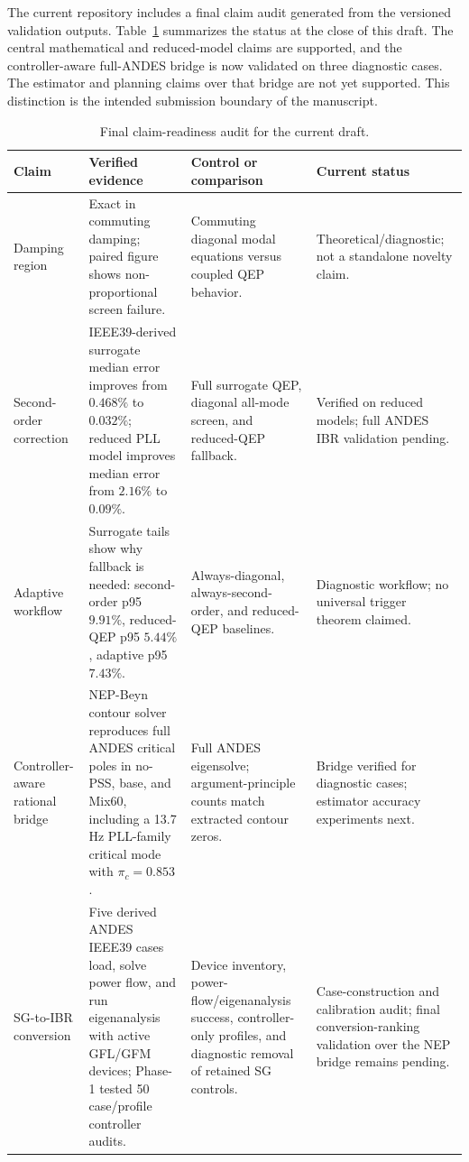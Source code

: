 \documentclass[journal]{IEEEtran}
\begin{document}
The current repository includes a final claim audit generated from the versioned validation outputs. Table~\ref{tab:finalaudit} summarizes the status at the close of this draft. The central mathematical and reduced-model claims are supported, and the controller-aware full-ANDES bridge is now validated on three diagnostic cases. The estimator and planning claims over that bridge are not yet supported. This distinction is the intended submission boundary of the manuscript.

\begin{table}[t]
\centering
\caption{Final claim-readiness audit for the current draft.}
\label{tab:finalaudit}
\scriptsize
\begin{tabular}{@{}p{}p{}p{}p{}@{}}
\toprule
Claim & Verified evidence & Control or comparison & Current status\\
\midrule
Damping region
& Exact in commuting damping; paired figure shows non-proportional screen failure.
& Commuting diagonal modal equations versus coupled QEP behavior.
& Theoretical/diagnostic; not a standalone novelty claim.\\
Second-order correction
& IEEE39-derived surrogate median error improves from $0.468\%$ to $0.032\%$; reduced PLL model improves median error from $2.16\%$ to $0.09\%$.
& Full surrogate QEP, diagonal all-mode screen, and reduced-QEP fallback.
& Verified on reduced models; full ANDES IBR validation pending.\\
Adaptive workflow
& Surrogate tails show why fallback is needed: second-order p95 $9.91\%$, reduced-QEP p95 $5.44\%$, adaptive p95 $7.43\%$.
& Always-diagonal, always-second-order, and reduced-QEP baselines.
& Diagnostic workflow; no universal trigger theorem claimed.\\
Controller-aware rational bridge
& NEP-Beyn contour solver reproduces full ANDES critical poles in no-PSS, base, and Mix60, including a 13.7 Hz PLL-family critical mode with $\pi_c=0.853$.
& Full ANDES eigensolve; argument-principle counts match extracted contour zeros.
& Bridge verified for diagnostic cases; estimator accuracy experiments next.\\
SG-to-IBR conversion
& Five derived ANDES IEEE39 cases load, solve power flow, and run eigenanalysis with active GFL/GFM devices; Phase-1 tested 50 case/profile controller audits.
& Device inventory, power-flow/eigenanalysis success, controller-only profiles, and diagnostic removal of retained SG controls.
& Case-construction and calibration audit; final conversion-ranking validation over the NEP bridge remains pending.\\

\end{tabular}
\end{table}
\end{document}
